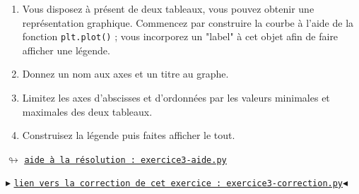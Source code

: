\documentclass[11pt]{article}
\begin{document}
\begin{enumerate}
 \smallskip
 
 
 \item Vous disposez à présent de deux tableaux, vous pouvez obtenir une représentation graphique. Commencez par construire la courbe à l'aide de la fonction \texttt{plt.plot()} ; vous incorporez un "label" à cet objet afin de faire afficher une légende.
 
 
 \medskip
 
 \item Donnez un nom aux axes et un titre au graphe.
 
 \medskip
 
 \item Limitez les axes d'abscisses et d'ordonnées par les valeurs minimales et maximales des deux tableaux.
 
 \medskip
 \item Construisez la légende puis faites afficher le tout.
 

\end{enumerate}




\begin{center}
 $\looparrowright$ \href{https://github.com/formationPythonPC-Juin/aides-formation/blob/master/exercice3-aide.py}{\underline{\texttt{aide à la résolution : exercice3-aide.py}}}
\end{center}



\begin{center}
$\blacktriangleright$ \href{https://github.com/formationPythonPC-Juin/corrections-formation/blob/master/exercice3-correction.py}{\underline{\texttt{lien vers la correction de cet exercice : exercice3-correction.py}}}$\blacktriangleleft$                                                                                                                                                                    \end{center}









\end{document}
